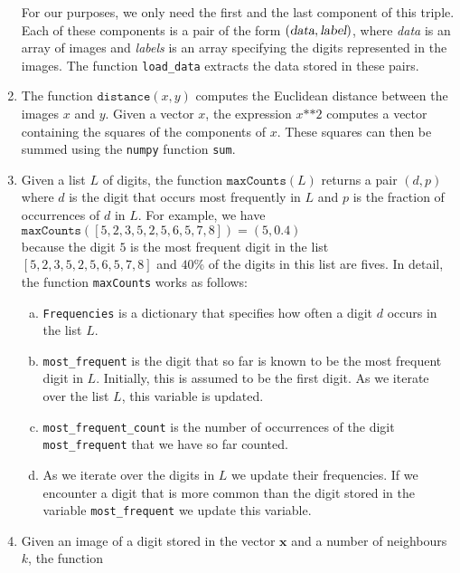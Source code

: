 \begin{enumerate}
      For our purposes, we only need the first and the last component of this triple.  Each of these components
      is a pair of the form $(\textsl{data}, \textsl{label})$, where \textsl{data} is an array of images and
      \textsl{labels} is an array specifying the digits represented in the images.
      The function \texttt{load\_data} extracts the data stored in these pairs.
\item The function $\mathtt{distance}(x, y)$ computes the Euclidean distance between the images $x$ and $y$.
      Given a vector $x$, the expression $x \texttt{**} 2$ computes a vector containing the squares of the
      components of $x$.  These squares can then be summed using the \texttt{numpy} function \texttt{sum}.
\item Given a list $L$ of digits, the function $\texttt{maxCounts}(L)$ returns a pair $(d, p)$ where $d$ is the digit that occurs most frequently in $L$
      and $p$ is the fraction of occurrences of $d$ in $L$.  For example, we have
      \\[0.2cm]
      \hspace*{1.3cm}
      $\texttt{maxCounts}([5,2,3,5,2,5,6,5,7,8]) = (5, 0.4)$
      \\[0.2cm]
      because the digit $5$ is the most frequent digit in the list $[5,2,3,5,2,5,6,5,7,8]$ and $40$\%
      of the digits in this list are fives.  In detail, the function \texttt{maxCounts} works as follows:
      \begin{enumerate}[(a)]
      \item \texttt{Frequencies} is a dictionary that specifies how often a digit $d$ occurs in the list $L$.
      \item \texttt{most\_frequent} is the digit that so far is known to be the most frequent digit in $L$.
            Initially, this is assumed to be the first digit.  As we iterate over the list $L$, this variable
            is updated.
      \item \texttt{most\_frequent\_count} is the number of occurrences of the digit \texttt{most\_frequent}
            that we have so far counted.
      \item As we iterate over the digits in $L$ we update their frequencies.  If we encounter a digit that is
            more common than the digit stored in the variable \texttt{most\_frequent} we update this variable.
      \end{enumerate}
\item Given an image of a digit stored in the vector $\mathbf{x}$ and a number of neighbours $k$, the function

\end{enumerate}
